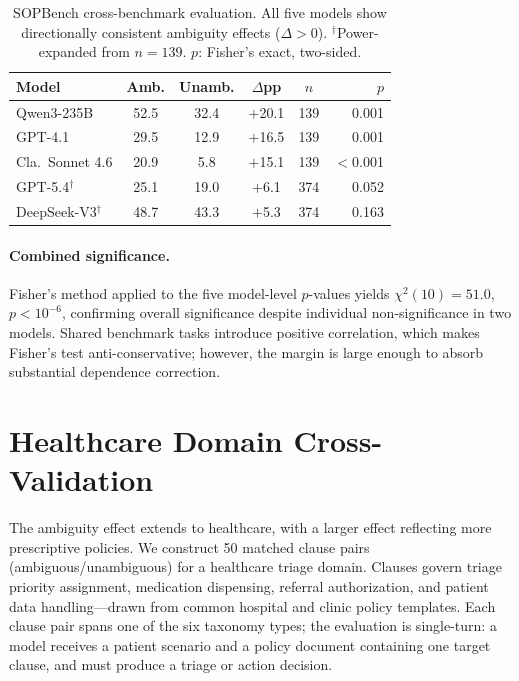 \begin{table}[h]
\centering
\small
\caption{SOPBench cross-benchmark evaluation. All five models show directionally consistent ambiguity effects ($\Delta > 0$). $^\dagger$Power-expanded from $n = 139$. $p$: Fisher's exact, two-sided.}
\label{tab:sopbench}
\setlength{\tabcolsep}{4pt}
\begin{tabular}{lccccr}
\toprule
Model & Amb. & Unamb. & $\Delta$pp & $n$ & $p$ \\
\midrule
Qwen3-235B & 52.5 & 32.4 & $+$20.1 & 139 & 0.001 \\
GPT-4.1 & 29.5 & 12.9 & $+$16.5 & 139 & 0.001 \\
Cla.\ Sonnet 4.6 & 20.9 & 5.8 & $+$15.1 & 139 & $<$0.001 \\
GPT-5.4$^\dagger$ & 25.1 & 19.0 & $+$6.1 & 374 & 0.052 \\
DeepSeek-V3$^\dagger$ & 48.7 & 43.3 & $+$5.3 & 374 & 0.163 \\
\bottomrule
\end{tabular}
\end{table}

\paragraph{Combined significance.} Fisher's method applied to the five model-level $p$-values yields $\chi^2(10) = 51.0$, $p < 10^{-6}$, confirming overall significance despite individual non-significance in two models. Shared benchmark tasks introduce positive correlation, which makes Fisher's test anti-conservative; however, the margin is large enough to absorb substantial dependence correction.

\section{Healthcare Domain Cross-Validation}
\label{app:healthcare}

The ambiguity effect extends to healthcare, with a larger effect reflecting more prescriptive policies. We construct 50 matched clause pairs (ambiguous/unambiguous) for a healthcare triage domain. Clauses govern triage priority assignment, medication dispensing, referral authorization, and patient data handling---drawn from common hospital and clinic policy templates. Each clause pair spans one of the six taxonomy types; the evaluation is single-turn: a model receives a patient scenario and a policy document containing one target clause, and must produce a triage or action decision.

